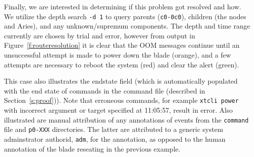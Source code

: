 Finally, we are interested in determining if this problem got resolved and how. We utilize the depth search
\texttt{-d 1} to query parents (\texttt{c0-0c0}), children (the nodes and Aries), and any unknown/supremum components.
The depth and time range currently
are chosen by trial and error, however from output in Figure~\ref{f:routeresolution} it is clear that the OOM messages continue until an unsuccessful attempt is made to power
down the blade (orange), and a few attempts are necessary to reboot the system (red) and clear the alert (green). 

This case also illustrates
the endstate field (which is automatically populated with the end state of commands in the command file (described in Section~\ref{s:proof})). Note that erroneous commands, for example \texttt{xtcli power} with incorrect argument or target specified at 11:05:57, result in error. Also illustrated are manual attribution of any annotations of events from the \texttt{command} file and \texttt{p0-XXX} directories. The latter are
attributed to a generic system adminstrator authorid, \texttt{adm}, for the annotation, as opposed to the human annotation of the blade reseating in the previous example.

